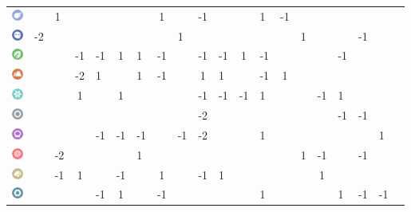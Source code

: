\begin{table}[h]
\begin{center}
\begin{tabular}{c c g c g c g c g c g c g c g c g c g c}
    \includegraphics[width=1em]{images/flying.png} & & 1 & & & & & 1 & & -1 & & & 1 & -1 & & & & & \\ %
    \includegraphics[width=1em]{images/ghost.png} & -2 & & & & & & & 1 & & & & & & 1 & & & -1 & \\ %
    \includegraphics[width=1em]{images/grass.png} & & & -1 & -1 & 1 & 1 & -1 & & -1 & -1 & 1 & -1 & & & & -1 & & \\ %
    \includegraphics[width=1em]{images/ground.png} & & & -2 & 1 & & 1 & -1 & & 1 & 1 & & -1 & 1 & & & & & \\ %
    \includegraphics[width=1em]{images/ice.png} & & & 1 & & 1 & & & & -1 & -1 & -1 & 1 & & & -1 & 1 & & \\ %
    \includegraphics[width=1em]{images/normal.png} & & & & & & & & & -2 & & & & & & & -1 & -1 & \\ %
    \includegraphics[width=1em]{images/poison.png} & & & & -1 & -1 & -1 & & -1 & -2 & & & 1 & & & & & & 1 \\ %
    \includegraphics[width=1em]{images/psychic.png} & & -2 & &  & & 1 & & &  & & & & & 1 & -1 & & -1 & &  \\ %
    \includegraphics[width=1em]{images/rock.png} & & -1 & 1 & & -1 & & 1 & & -1 & 1 & & & & & 1 & & & \\ %
    \includegraphics[width=1em]{images/steel.png} & & & & -1 & 1 & & -1 & & & & & 1 & & & & 1 & -1 & -1 \\ %

\end{tabular}
\end{center}
\end{table}
